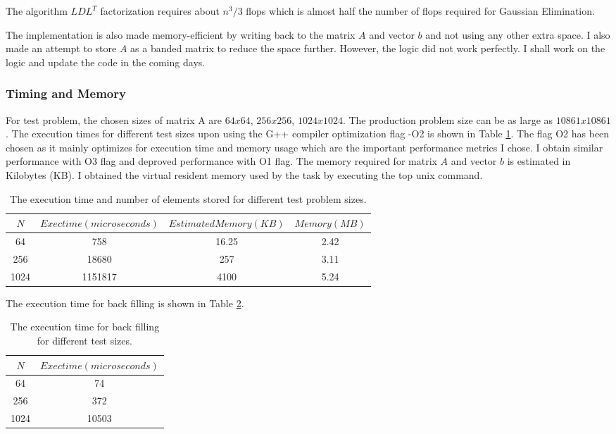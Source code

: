 \documentclass{article}
\begin{document}
\begin{spacing}{1.1}
The algorithm $LDL^T$ factorization requires about $n^3/3$ flops which is almost half the number of flops required for Gaussian Elimination. 

The implementation is also made memory-efficient by writing back to the matrix $A$ and vector $b$ and not using any other extra space. I also made an attempt to store $A$ as a banded matrix to reduce the space further. However, the logic did not work perfectly. I shall work on the logic and update the code in the coming days.

\subsubsection*{Timing and Memory}
For test problem, the chosen sizes of matrix A are $64x64$, $256x256$, $1024x1024$. The production problem size can be as large as $10861x10861$. 
The execution times for different test sizes upon using the G++ compiler optimization flag -O2 is shown in Table \ref{exec_direct}. The flag O2 has been chosen as it mainly optimizes for execution time and memory usage which are the important performance metrics I chose. I obtain similar performance with O3 flag and deproved performance with O1 flag. 
The memory required for matrix $A$ and vector $b$ is estimated in Kilobytes (KB). I obtained the virtual resident memory used by the task by executing the top unix command. 

\begin{table}[H]
\begin{center}
 \begin{tabular}{| c | c | c | c |} 
 \hline
$N$ & $Exec time (microseconds)$  & $Estimated Memory (KB)$ & $Memory (MB)$  \\ %
 \hline
64 & 758 & 16.25 & 2.42  \\ %
256 &  18680 &257 & 3.11 \\ %
1024 &  1151817 & 4100 & 5.24 \\ %
 \hline
\end{tabular}%
\end{center}
\caption{\label{exec_direct} The execution time and number of elements stored for different test problem sizes.  } 
\end{table}

The execution time for back filling is shown in Table \ref{backfill_direct}.

\begin{table}[H]
\begin{center}
 \begin{tabular}{| c | c |} 
 \hline
$N$ & $Exec time (microseconds)$ \\ %
 \hline
64 & 74  \\ %
256 &  372 \\ %
1024 &  10503  \\ %
 \hline
\end{tabular}%
\end{center}
\caption{\label{backfill_direct} The execution time for back filling for different test sizes.  } 
\end{table}


\end{spacing}
\end{document}
